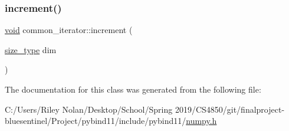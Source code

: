 \mbox{\label{classcommon__iterator_a6f54104a4b0847b87bab424db09b85d7}} 
\subsubsection{\texorpdfstring{increment()}{increment()}}
{\footnotesize\ttfamily \mbox{\hyperlink{_s_d_l__opengles2__gl2ext_8h_ae5d8fa23ad07c48bb609509eae494c95}{void}} common\+\_\+iterator\+::increment (\begin{DoxyParamCaption}\item[{\mbox{\hyperlink{classcommon__iterator_a1b9c8bc2b0275b8b9b6f5410b6f96148}{size\+\_\+type}}}]{dim }\end{DoxyParamCaption})\hspace{0.3cm}{\ttfamily [inline]}}



The documentation for this class was generated from the following file\+:\begin{DoxyCompactItemize}
\item 
C\+:/\+Users/\+Riley Nolan/\+Desktop/\+School/\+Spring 2019/\+C\+S4850/git/finalproject-\/bluesentinel/\+Project/pybind11/include/pybind11/\mbox{\hyperlink{numpy_8h}{numpy.\+h}}\end{DoxyCompactItemize}
